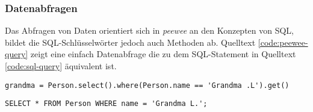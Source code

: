 \subsubsection*{Datenabfragen}

Das Abfragen von Daten orientiert sich in \emph{peewee} an den Konzepten von SQL, bildet die SQL-Schlüsselwörter jedoch auch Methoden ab. Quelltext \ref{code:peewee-query} zeigt eine einfach Datenabfrage die zu dem SQL-Statement in Quelltext \ref{code:sql-query} äquivalent ist.

\lstset{language=python}
\begin{lstlisting}[caption={Python-Code zum Abfragen eines Objektes aus der Datenbank.  \cite{noauthor_quickstart_2023}}, label=code:peewee-query]
    grandma = Person.select().where(Person.name == 'Grandma .L').get()
\end{lstlisting}

\lstset{language=sql}
\begin{lstlisting}[caption={SQL-Abfrage mit SELECT und WHERE.}, label=code:sql-query]
    SELECT * FROM Person WHERE name = 'Grandma L.';
\end{lstlisting}

